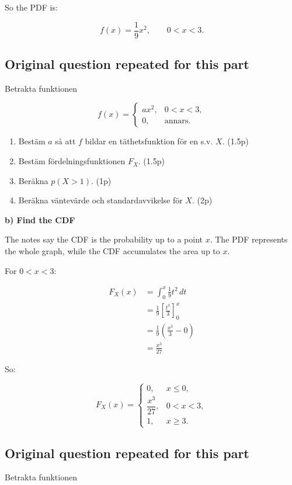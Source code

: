 \documentclass[10pt]{article}
\begin{document}
So the PDF is:

\[
f(x)=\frac{1}{9}x^2,
\qquad 0<x<3.
\]

\subsection*{Original question repeated for this part}
Betrakta funktionen

\[
f(x)=
\begin{cases}
ax^2,
& 0<x<3,\\
0,
& \text{annars.}
\end{cases}
\]

\begin{enumerate}[label=\alph*)]
\item
Bestäm $a$ så att $f$ bildar en täthetsfunktion för en s.v. $X$.
\hfill (1.5p)

\item
Bestäm fördelningsfunktionen $F_X$.
\hfill (1.5p)

\item
Beräkna $p(X>1)$.
\hfill (1p)

\item
Beräkna väntevärde och standardavvikelse för $X$.
\hfill (2p)
\end{enumerate}

\textbf{b) Find the CDF}

The notes say the CDF is the probability up to a point $x$.
The PDF represents the whole graph, while the CDF accumulates
the area up to $x$.

For $0<x<3$:

\begin{align*}
F_X(x)
&=
\int_0^x
\frac{1}{9}t^2\,dt \\[2mm]
&=
\frac{1}{9}
\left[
\frac{t^3}{3}
\right]_0^x \\[2mm]
&=
\frac{1}{9}
\left(
\frac{x^3}{3}-0
\right) \\[2mm]
&=
\frac{x^3}{27}
\end{align*}

So:

\[
F_X(x)=
\begin{cases}
0,
& x\leq 0,\\
\dfrac{x^3}{27},
& 0<x<3,\\
1,
& x\geq 3.
\end{cases}
\]

\subsection*{Original question repeated for this part}
Betrakta funktionen
\end{document}
